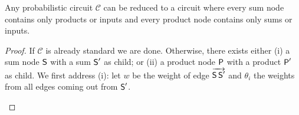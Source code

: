 \begin{theorem}[Standardization]
  \label{thm:standard}
  Any probabilistic circuit $\mathcal{C}$ can be reduced to a circuit where every sum node contains
  only products or inputs and every product node contains only sums or inputs.
\end{theorem}
\begin{proof}
  If $\mathcal{C}$ is already standard we are done. Otherwise, there exists either (i) a sum node
  $\operatorname{\textsf{S}}$ with a sum $\operatorname{\textsf{S}}'$ as child; or (ii) a product node $\operatorname{\textsf{P}}$ with a product $\operatorname{\textsf{P}}'$ as
  child. We first address (i): let $w$ be the weight of edge $\overrightarrow{\operatorname{\textsf{S}}\operatorname{\textsf{S}}'}$ and $\theta_i$
  the weights from all edges coming out from $\operatorname{\textsf{S}}'$.
  \begin{center}
\end{center}
\end{proof}
